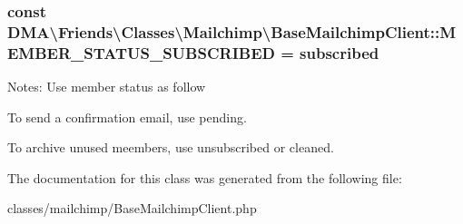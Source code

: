 \subsubsection[{M\+E\+M\+B\+E\+R\+\_\+\+S\+T\+A\+T\+U\+S\+\_\+\+S\+U\+B\+S\+C\+R\+I\+B\+E\+D}]{\setlength{\rightskip}{0pt plus 5cm}const D\+M\+A\textbackslash{}\+Friends\textbackslash{}\+Classes\textbackslash{}\+Mailchimp\textbackslash{}\+Base\+Mailchimp\+Client\+::\+M\+E\+M\+B\+E\+R\+\_\+\+S\+T\+A\+T\+U\+S\+\_\+\+S\+U\+B\+S\+C\+R\+I\+B\+E\+D = \textquotesingle{}subscribed\textquotesingle{}}\label{classDMA_1_1Friends_1_1Classes_1_1Mailchimp_1_1BaseMailchimpClient_ab8ce8a5ff60b428f9af63c4a7ff9bbcf}
Notes\+: Use member status as follow
\begin{DoxyItemize}
\item To send a confirmation email, use \textquotesingle{}pending\textquotesingle{}.
\item To archive unused meembers, use \textquotesingle{}unsubscribed\textquotesingle{} or \textquotesingle{}cleaned\textquotesingle{}. 
\end{DoxyItemize}

The documentation for this class was generated from the following file\+:\begin{DoxyCompactItemize}
\item 
classes/mailchimp/Base\+Mailchimp\+Client.\+php\end{DoxyCompactItemize}
